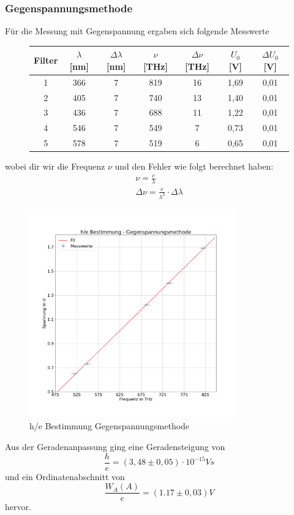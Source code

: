 \documentclass{scrartcl}
\begin{document}
		\subsubsection{Gegenspannungsmethode}
			Für die Messung mit Gegenspannung ergaben sich folgende Messwerte 
			\begin{figure}[H]
				\centering
				\begin{tabular}{|c|c|c|c|c|c|c|}
					\hline
					Filter & $\lambda$ [nm] & $\Delta\lambda$ [nm] & $\nu$ [THz] & $\Delta\nu$ [THz] & $U_0$ [V] & $\Delta U_0$ [V] \\
					
					\hline
					1 & 366 & 7 & 819 & 16 & 1,69 & 0,01\\
					2 & 405 & 7 & 740 & 13 & 1,40 & 0,01\\ 
					3 & 436 & 7 & 688 & 11 & 1,22 & 0,01\\
					4 & 546 & 7 & 549 & 7 & 0,73 & 0,01\\
					5 & 578 & 7 & 519 & 6 & 0,65 & 0,01\\
					\hline
				\end{tabular}
			\end{figure}
			wobei dir wir die Frequenz $\nu$ und den Fehler wie folgt berechnet haben:
			\begin{align}
				\nu = \frac{c}{\lambda} \\
				\Delta \nu = \frac{c}{\lambda^2} \cdot \Delta \lambda
			\end{align}
			\begin{figure}[H]
				\centering
				\includegraphics[width=0.8\textwidth]{he_gegenspannung.png}
				\caption{h/e Bestimmung Gegenspannungsmethode}
			\end{figure}
			Aus der Geradenanpassung ging eine Geradensteigung von 
			\begin{equation}
				\frac{h}{e} = (3,48\pm 0,05)\cdot 10^{-15}V s
			\end{equation}
			und ein Ordinatenabschnitt von
			\begin{equation}
				\frac{W_A(A)}{e} = (1.17\pm 0,03)V
			\end{equation}
			hervor.
\end{document}
